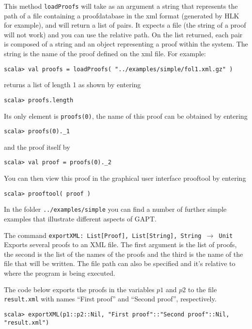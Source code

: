 \documentclass[a4paper,11pt]{article}
\begin{document}
This method \texttt{loadProofs} will take as an argument a string that represents the path of a file
containing a proofdatabase in the xml format (generated by HLK for example), and will return a list 
of pairs. It expects a file (the string of a proof will not work) and you can use 
the relative path. On the list returned, each pair is composed of a string and 
an object representing a proof within the system. The string is the name of the 
proof defined on the xml file. For example:
%
\begin{lstlisting}
scala> val proofs = loadProofs( "../examples/simple/fol1.xml.gz" )
\end{lstlisting}
%
returns a list of length 1 as shown by entering
%
\begin{lstlisting}
scala> proofs.length
\end{lstlisting}
%
Its only element is {\tt proofs(0)}, the name of this proof can be obtained by
entering
%
\begin{lstlisting}
scala> proofs(0)._1
\end{lstlisting}
%
and the proof itself by
%
\begin{lstlisting}
scala> val proof = proofs(0)._2
\end{lstlisting}
%
You can then view this proof in the graphical user interface prooftool by 
entering
%
\begin{lstlisting}
scala> prooftool( proof )
\end{lstlisting}
%
In the folder {\tt ../examples/simple} you can find a number of further simple
examples that illustrate different aspects of GAPT.





The command \texttt{exportXML: List[Proof], List[String], String $\rightarrow$ Unit}
Exports several proofs to an XML file. The first argument is the list of proofs,
the second is the list of the names of the proofs and the third is the name of
the file that will be written. The file path can also be specified and it's
relative to where the program is being executed.

The code below exports the proofs in the variables $p1$ and $p2$ to the file
\texttt{result.xml} with names ``First proof'' and ``Second proof'',
respectively.
\begin{lstlisting}
scala> exportXML(p1::p2::Nil, "First proof"::"Second proof"::Nil, "result.xml")
\end{lstlisting}
\end{document}
